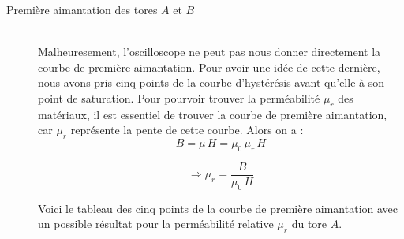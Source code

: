 \documentclass{article}
\begin{document}
\begin{description}

\item[Première aimantation des tores $A$ et $B$] \hfill \\

Malheuresement, l'oscilloscope ne peut pas nous donner directement la courbe de première aimantation. Pour avoir une idée de cette dernière, nous avons pris cinq points de la courbe d'hystérésis avant qu'elle à son point de saturation. Pour pourvoir trouver la perméabilité $\mu_r$ des matériaux, il est essentiel de trouver la courbe de première aimantation, car $\mu_r$ représente la pente de cette courbe. Alors on a :\\

\begin{equation}
B = \mu\, H = \mu_0\, \mu_r\, H
\end{equation}

\begin{equation}
\Rightarrow \mu_r = \frac{B}{\mu_0\, H}
\end{equation}

Voici le tableau des cinq points de la courbe de première aimantation avec un possible résultat pour la perméabilité relative $\mu_r$ du tore $A$.


\end{description}
\end{document}
